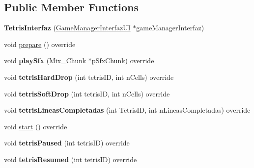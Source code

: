 \subsection*{Public Member Functions}
\begin{DoxyCompactItemize}
\item 
{\bfseries Tetris\+Interfaz} (\hyperlink{class_game_manager_interfaz_u_i}{Game\+Manager\+Interfaz\+UI} $\ast$game\+Manager\+Interfaz)\hypertarget{class_tetris_interfaz_ab755f482a9d6fdd2fc459a2333b55942}{}\label{class_tetris_interfaz_ab755f482a9d6fdd2fc459a2333b55942}

\item 
void \hyperlink{class_tetris_interfaz_abc98e6a4974e89f5dd40177439c07d54}{prepare} () override
\item 
void {\bfseries play\+Sfx} (Mix\+\_\+\+Chunk $\ast$p\+Sfx\+Chunk) override\hypertarget{class_tetris_interfaz_a56a38ee2ae93181012b186d16e53ac91}{}\label{class_tetris_interfaz_a56a38ee2ae93181012b186d16e53ac91}

\item 
void {\bfseries tetris\+Hard\+Drop} (int tetris\+ID, int n\+Cells) override\hypertarget{class_tetris_interfaz_ad7ef2fa8b265ccea1ba85cd92b1f540a}{}\label{class_tetris_interfaz_ad7ef2fa8b265ccea1ba85cd92b1f540a}

\item 
void {\bfseries tetris\+Soft\+Drop} (int tetris\+ID, int n\+Cells) override\hypertarget{class_tetris_interfaz_a0562d0c31132c1f45035b2b81db93050}{}\label{class_tetris_interfaz_a0562d0c31132c1f45035b2b81db93050}

\item 
void {\bfseries tetris\+Lineas\+Completadas} (int Tetris\+ID, int n\+Lineas\+Completadas) override\hypertarget{class_tetris_interfaz_a2e9ff66f3ac2fe47ccb82f08cd00a26b}{}\label{class_tetris_interfaz_a2e9ff66f3ac2fe47ccb82f08cd00a26b}

\item 
void \hyperlink{class_tetris_interfaz_a9a600a6aab6f3d92b1792e35d3ae4897}{start} () override
\item 
void {\bfseries tetris\+Paused} (int tetris\+ID) override\hypertarget{class_tetris_interfaz_ad4e9da8e0d0a8e3b201e84627c7a7649}{}\label{class_tetris_interfaz_ad4e9da8e0d0a8e3b201e84627c7a7649}

\item 
void {\bfseries tetris\+Resumed} (int tetris\+ID) override\hypertarget{class_tetris_interfaz_ab9765187185c942e9e6cd27bb0606da6}{}\label{class_tetris_interfaz_ab9765187185c942e9e6cd27bb0606da6}


\end{DoxyCompactItemize}
